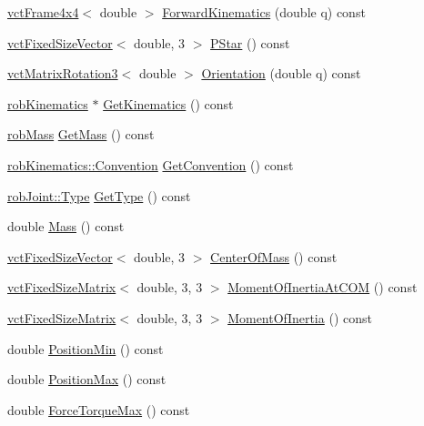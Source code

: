 \begin{DoxyCompactItemize}
\hyperlink{classvct_frame4x4}{vct\+Frame4x4}$<$ double $>$ \hyperlink{classrob_link_a1dc4dfce2a402d934f9c7e355c94e458}{Forward\+Kinematics} (double q) const 
\item 
\hyperlink{classvct_fixed_size_vector}{vct\+Fixed\+Size\+Vector}$<$ double, 3 $>$ \hyperlink{classrob_link_acd240f7a9609e54400811940131814da}{P\+Star} () const 
\item 
\hyperlink{classvct_matrix_rotation3}{vct\+Matrix\+Rotation3}$<$ double $>$ \hyperlink{classrob_link_a94ed71cb4c204e3fa29cd868891e626d}{Orientation} (double q) const 
\item 
\hyperlink{classrob_kinematics}{rob\+Kinematics} $\ast$ \hyperlink{classrob_link_aad5e8b2c6ecbc2203c77774517ec5afe}{Get\+Kinematics} () const 
\item 
\hyperlink{classrob_mass}{rob\+Mass} \hyperlink{classrob_link_a43269c243616e27131e91adc0a0251f2}{Get\+Mass} () const 
\item 
\hyperlink{classrob_kinematics_a298703e920da583d1f6aa60c8f65ca78}{rob\+Kinematics\+::\+Convention} \hyperlink{classrob_link_aa382b84e5e3fa242ffb67860002096bd}{Get\+Convention} () const 
\item 
\hyperlink{classrob_joint_a558d78a642cf2101aceddce0d82379b6}{rob\+Joint\+::\+Type} \hyperlink{classrob_link_a0053248e96d0b42e170bbee51e9e0606}{Get\+Type} () const 
\item 
double \hyperlink{classrob_link_a9c19539fa0f402dc8c496faf2632713a}{Mass} () const 
\item 
\hyperlink{classvct_fixed_size_vector}{vct\+Fixed\+Size\+Vector}$<$ double, 3 $>$ \hyperlink{classrob_link_aef245c56c6275da91a17ec04844c4f7c}{Center\+Of\+Mass} () const 
\item 
\hyperlink{classvct_fixed_size_matrix}{vct\+Fixed\+Size\+Matrix}$<$ double, 3, 3 $>$ \hyperlink{classrob_link_a7a2448af5a1fce4293c9b6ad801ea461}{Moment\+Of\+Inertia\+At\+C\+O\+M} () const 
\item 
\hyperlink{classvct_fixed_size_matrix}{vct\+Fixed\+Size\+Matrix}$<$ double, 3, 3 $>$ \hyperlink{classrob_link_a7a490ea913361ad155fa698080f1501f}{Moment\+Of\+Inertia} () const 
\item 
double \hyperlink{classrob_link_a95eb30b91371aab58976d2af316385d5}{Position\+Min} () const 
\item 
double \hyperlink{classrob_link_a0ac05c903c18d1e8db3ccbdec9312349}{Position\+Max} () const 
\item 
double \hyperlink{classrob_link_a09d91b44253f90a14442cc0ade0cb687}{Force\+Torque\+Max} () const 
\end{DoxyCompactItemize}
